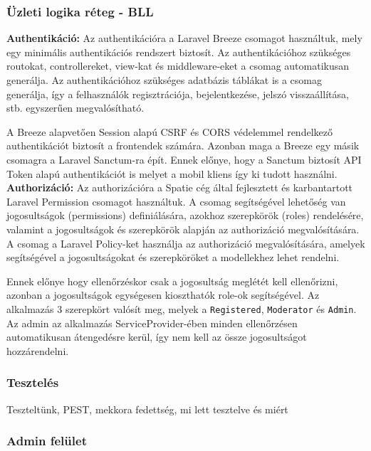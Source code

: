 \subsubsection{Üzleti logika réteg - BLL}


\textbf{Authentikáció:} Az authentikációra a Laravel Breeze \cite{LaravelBreeze} csomagot használtuk, mely egy minimális authentikációs rendszert biztosít. Az authentikációhoz szükséges routokat, controllereket, view-kat és middleware-eket a csomag automatikusan generálja. Az authentikációhoz szükséges adatbázis táblákat is a csomag generálja, így a felhasználók regisztrációja, bejelentkezése, jelszó visszaállítása, stb. egyszerűen megvalósítható.

A Breeze alapvetően Session alapú CSRF és CORS védelemmel rendelkező authentikációt biztosít a frontendek számára. Azonban maga a Breeze egy másik csomagra a Laravel Sanctum-ra \cite{LaravelSanctum} épít. Ennek előnye, hogy a Sanctum biztosít API Token alapú authentikációt is melyet a mobil kliens így ki tudott használni.\\

\textbf{Authorizáció:} Az authorizációra a Spatie cég által fejlesztett és karbantartott Laravel Permission csomagot \cite{LaravelPermissions} használtuk. A csomag segítségével lehetőség van jogosultságok (permissions) definiálására, azokhoz szerepkörök (roles) rendelésére, valamint a jogosultságok és szerepkörök alapján az authorizáció megvalósítására. A csomag a Laravel Policy-ket használja az authorizáció megvalósítására, amelyek segítségével a jogosultságokat és szerepköröket a modellekhez lehet rendelni.

Ennek előnye hogy ellenőrzéskor csak a jogosultság meglétét kell ellenőrizni, azonban a jogosultságok egységesen kioszthatók role-ok segítségével. Az alkalmazás 3 szerepkört valósít meg, melyek a \texttt{Registered}, \texttt{Moderator} és \texttt{Admin}. Az admin az alkalmazás ServiceProvider-ében minden ellenőrzésen automatikusan átengedésre kerül, így nem kell az össze jogosultságot hozzárendelni.\\

\subsubsection{Tesztelés}

Teszteltünk, PEST, mekkora fedettség, mi lett tesztelve és miért

\subsubsection{Admin felület}

